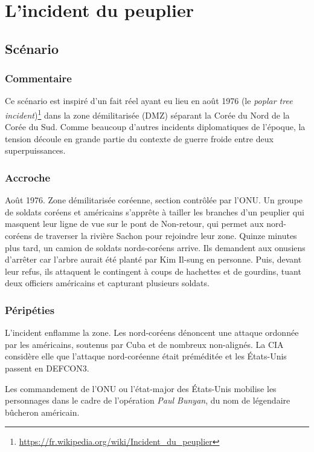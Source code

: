 \chapter{L'incident du peuplier}

\section{Scénario}

\subsection{Commentaire}

Ce scénario est inspiré d'un fait réel ayant eu lieu en août 1976 (le \emph{poplar tree incident})\footnote{\url{https://fr.wikipedia.org/wiki/Incident_du_peuplier}} dans la zone démilitarisée (DMZ) séparant la Corée du Nord de la Corée du Sud.
Comme beaucoup d'autres incidents diplomatiques de l'époque, la tension découle en grande partie du contexte de guerre froide entre deux superpuissances.

\subsection{Accroche}

Août 1976. Zone démilitarisée coréenne, section contrôlée par l'ONU. Un groupe de soldats coréens et américains s'apprête à tailler les branches d'un peuplier qui masquent leur ligne de vue sur le \og pont de Non-retour\fg, qui permet aux nord-coréens de traverser la rivière Sachon pour rejoindre leur zone. Quinze minutes plus tard, un camion de soldats nords-coréens arrive. Ils demandent aux onusiens d'arrêter car l'arbre aurait été planté par Kim Il-sung en personne. Puis, devant leur refus, ils attaquent le contingent à coups de hachettes et de gourdins, tuant deux officiers américains et capturant plusieurs soldats.

\subsection{Péripéties}

L'incident enflamme la zone. Les nord-coréens dénoncent une attaque ordonnée par les américains, soutenus par Cuba et de nombreux non-alignés.
La CIA considère elle que l'attaque nord-coréenne était préméditée et les États-Unis passent en DEFCON3.

Les commandement de l'ONU ou l'état-major des États-Unis mobilise les personnages dans le cadre de l'opération \emph{Paul Bunyan}, du nom de légendaire bûcheron américain.

